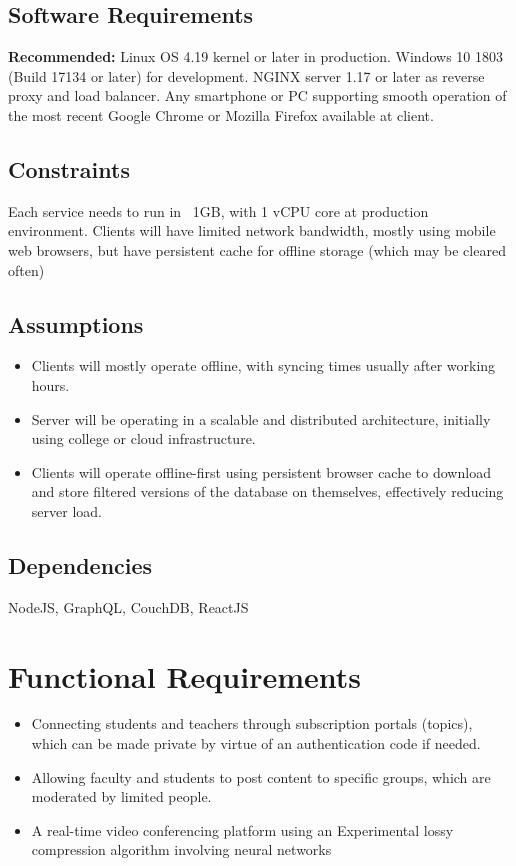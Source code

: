 \subsection{Software Requirements}

\textbf{Recommended:} 
Linux OS 4.19 kernel or later in production.
Windows 10 1803 (Build 17134 or later) for development.
NGINX server 1.17 or later as reverse proxy and load balancer.
Any smartphone or PC supporting smooth operation of the most recent 
Google Chrome or Mozilla Firefox available at client.

\subsection{Constraints}

Each service needs to run in ~1GB, with 1 vCPU core at production environment.
Clients will have limited network bandwidth, mostly using mobile web browsers, but 
have persistent cache for offline storage (which may be cleared often)

\subsection{Assumptions}

\begin{itemize}
    \item Clients will mostly operate offline, with syncing times usually after working hours.
    \item Server will be operating in a scalable and distributed architecture, 
    initially using college or cloud infrastructure.
    \item Clients will operate offline-first using persistent browser cache to download and store 
    filtered versions of the database on themselves, effectively reducing server load.
\end{itemize}

\subsection{Dependencies}

NodeJS, GraphQL, CouchDB, ReactJS

\section{Functional Requirements}

\begin{itemize}
    \item Connecting students and teachers through subscription portals (topics), 
    which can be made private by virtue of an authentication code if needed.
    \item Allowing faculty and students to post content to specific groups, 
    which are moderated by limited people.
    \item A real-time video conferencing platform using an Experimental 
    lossy compression algorithm involving neural networks
\end{itemize}

